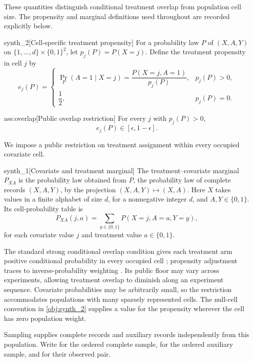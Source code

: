 These quantities distinguish conditional treatment overlap from population cell size. The propensity and marginal definitions used throughout are recorded explicitly below.

\begin{definitionv}{synth_2}[Cell-specific treatment propensity]
For a probability law \(P\) of \((X,A,Y)\) on \(\{1,\ldots,d\}\times\{0,1\}^2\), let \(p_j(P)=P(X=j)\). Define the treatment propensity in cell \(j\) by
\[
e_j(P)=
\begin{cases}
\Pr_P(A=1\mid X=j)
=\dfrac{P(X=j,A=1)}{p_j(P)},&p_j(P)>0,\\[6pt]
\dfrac12,&p_j(P)=0.
\end{cases}
\]
\end{definitionv}

\begin{assumptionv}{ass:overlap}[Public overlap restriction]
For every \(j\) with \(p_j(P)>0\),
\[
e_j(P)\in[\epsilon,1-\epsilon].
\]
\end{assumptionv}

We impose a public restriction on treatment assignment within every occupied covariate cell.

\begin{definitionv}{synth_1}[Covariate and treatment marginal]
The treatment–covariate marginal \(P_{XA}\) is the probability law obtained from \(P\), the probability law of complete records \((X,A,Y)\), by the projection \((X,A,Y)\mapsto(X,A)\). Here \(X\) takes values in a finite alphabet of size \(d\), for a nonnegative integer \(d\), and \(A,Y\in\{0,1\}\). Its cell-probability table is
\[
P_{XA}(j,a)
=
\sum_{y\in\{0,1\}} P(X=j,A=a,Y=y),
\]
for each covariate value \(j\) and treatment value \(a\in\{0,1\}\).
\end{definitionv}

The standard strong conditional overlap condition gives each treatment arm positive conditional probability in every occupied cell \citep[model (3)]{ZengBalakrishnanHanKennedy2026Discrete}; propensity adjustment traces to inverse-probability weighting \citep{Horvitz1952,Hirano2003}. Its public floor may vary across experiments, allowing treatment overlap to diminish along an experiment sequence. Covariate probabilities may be arbitrarily small, so the restriction accommodates populations with many sparsely represented cells. The null-cell convention in \cref{obj:synth_2} supplies a value for the propensity wherever the cell has zero population weight.

Sampling supplies complete records and auxiliary records independently from this population. Write  for the ordered complete sample,  for the ordered auxiliary sample, and  for their observed pair.



